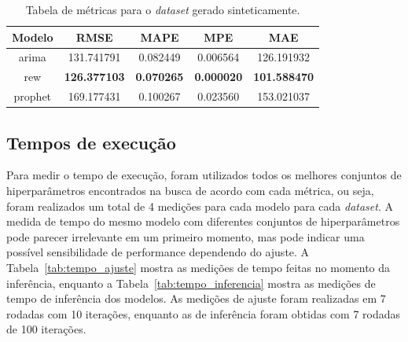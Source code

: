 \begin{table}[!htp]
    \caption{Tabela de métricas para o \textit{dataset} gerado sinteticamente.}
    \label{tab:synthetic_results}
    \setlength\extrarowheight{5pt}
    \centering
    \begin{tabular}{|c|c|c|c|c|}
        \hline
        \rowcolor[HTML]{C0C0C0}
        Modelo  & RMSE                & MAPE              & MPE               & MAE                 \\ \hline
        arima   & 131.741791          & 0.082449          & 0.006564          & 126.191932          \\ \hline
        \rowcolor[HTML]{EFEFEF}
        rew     & \textbf{126.377103} & \textbf{0.070265} & \textbf{0.000020} & \textbf{101.588470} \\ \hline
        prophet & 169.177431          & 0.100267          & 0.023560          & 153.021037          \\ \hline
    \end{tabular}
\end{table}


\subsection{Tempos de execução}
Para medir o tempo de execução, foram utilizados todos os melhores conjuntos de hiperparâmetros encontrados na busca de acordo com cada métrica, ou seja, foram realizados um total de 4 medições para cada modelo para cada \textit{dataset}. A medida de tempo do mesmo modelo com diferentes conjuntos de hiperparâmetros pode parecer irrelevante em um primeiro momento, mas pode indicar uma possível sensibilidade de performance dependendo do ajuste. A Tabela~\ref{tab:tempo_ajuste} mostra as medições de tempo feitas no momento da inferência, enquanto a Tabela~\ref{tab:tempo_inferencia} mostra as medições de tempo de inferência dos modelos. As medições de ajuste foram realizadas em 7 rodadas com 10 iterações, enquanto as de inferência foram obtidas com 7 rodadas de 100 iterações.

